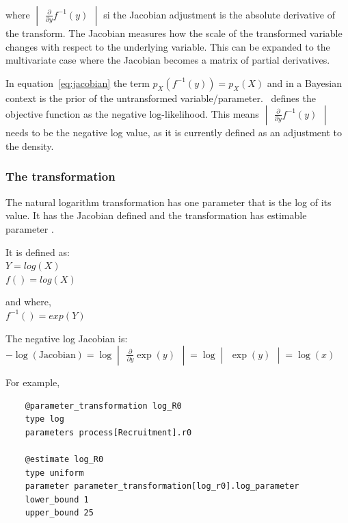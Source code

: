 where $\begin{vmatrix} \frac{\partial}{\partial y} f^{-1}(y) \end{vmatrix}$ si the Jacobian adjustment is the absolute derivative of the transform. The Jacobian measures how the scale of the transformed variable changes with respect to the underlying variable. This can be expanded to the multivariate case where the Jacobian becomes a matrix of partial derivatives.

In equation~\ref{eq:jacobian} the term $p_X(f^{-1}(y)) = p_X(X)$ and in a Bayesian context is the prior of the untransformed variable/parameter. \CNAME\ defines the objective function as the negative log-likelihood. This means \(\begin{vmatrix} \frac{\partial}{\partial y} f^{-1}(y) \end{vmatrix}\) needs to be the negative log value, as it is currently defined as an adjustment to the density.

\label{subsec:Transformation-types}
\subsubsection{The  transformation}\label{sec:Transformation-Log}

The natural logarithm transformation has one parameter that is the log of its value. It has the Jacobian defined and the transformation has estimable parameter . 

It is defined as: \\
$Y = log(X)$ \\
$f() = log(X)$

and where, \\
$f^{-1}() = exp(Y)$

The negative log Jacobian is: \\
$-\log(\text{Jacobian}) = \log \begin{vmatrix} \frac{\partial}{\partial y}  \exp(y) \end{vmatrix} = \log \begin{vmatrix} \exp(y) \end{vmatrix} = \log(x)$

For example,
{\small{\begin{verbatim}
	@parameter_transformation log_R0
	type log
	parameters process[Recruitment].r0
	
	@estimate log_R0
	type uniform
	parameter parameter_transformation[log_r0].log_parameter
	lower_bound 1
	upper_bound 25
\end{verbatim}}}

